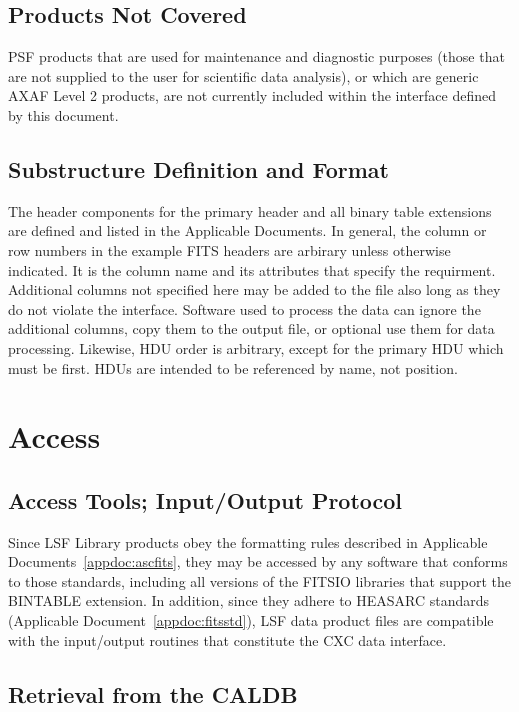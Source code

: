 \documentclass[twoside]{article}
\begin{document}
\subsection{Products Not Covered}

PSF products that are used for maintenance and diagnostic purposes
(those that are not supplied to the user for scientific data
analysis), or which are generic AXAF Level 2 products, are not
currently included within the interface defined by this document.

\subsection{Substructure Definition and Format}

The header components for the primary header and all binary table
extensions are defined and listed in the Applicable Documents. In
general, the column or row numbers in the example FITS headers
are arbirary unless otherwise indicated. It is the column name and
its attributes that specify the requirment. Additional columns not
specified here may be added to the file also long as they do not
violate the interface. Software used to process the data can
ignore the additional columns, copy them to the output file, or
optional use them for data processing. Likewise, HDU order is
arbitrary, except for the primary HDU which must be first. HDUs
are intended to be referenced by name, not position.

\section{Access}
\subsection{Access Tools; Input/Output Protocol}

Since LSF Library products obey the formatting rules described in
Applicable Documents~\ref{appdoc:ascfits},
they may be accessed by any software that conforms to those standards,
including all versions of the FITSIO libraries that support the
BINTABLE extension. In addition, since they adhere to HEASARC
standards (Applicable Document~\ref{appdoc:fitsstd}), LSF data product
files are compatible with the input/output routines that constitute
the CXC data interface.

\subsection{Retrieval from the CALDB}
\end{document}
